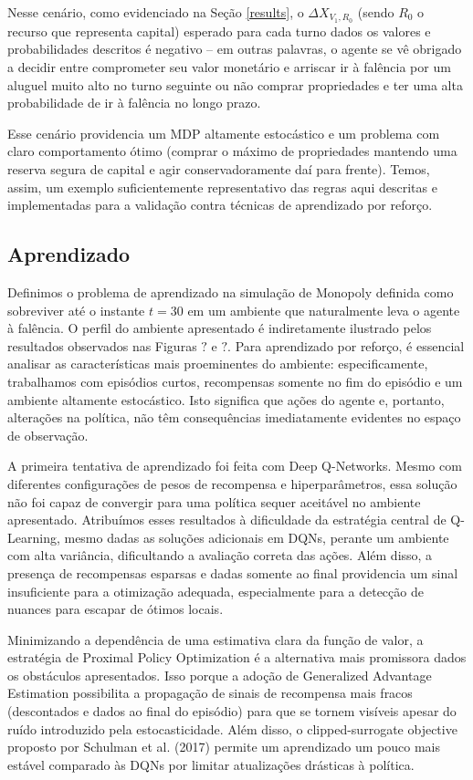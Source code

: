 \documentclass[conference]{IEEEtran}
\begin{document}
Nesse cenário, como evidenciado na Seção \ref{results}, o $\Delta X_{V_1,R_0}$ (sendo $R_0$ o recurso que representa capital) esperado para cada turno dados os valores e probabilidades descritos é negativo -- em outras palavras, o agente se vê obrigado a decidir entre comprometer seu valor monetário e arriscar ir à falência por um aluguel muito alto no turno seguinte ou não comprar propriedades e ter uma alta probabilidade de ir à falência no longo prazo.

Esse cenário providencia um MDP altamente estocástico e um problema com claro comportamento ótimo (comprar o máximo de propriedades mantendo uma reserva segura de capital e agir conservadoramente daí para frente). Temos, assim, um exemplo suficientemente representativo das regras aqui descritas e implementadas para a validação contra técnicas de aprendizado por reforço.

\subsection{Aprendizado}
\label{learning}
Definimos o problema de aprendizado na simulação de Monopoly definida como sobreviver até o instante $t=30$ em um ambiente que naturalmente leva o agente à falência. O perfil do ambiente apresentado é indiretamente ilustrado pelos resultados observados nas Figuras $?$ e $?$. Para aprendizado por reforço, é essencial analisar as características mais proeminentes do ambiente: especificamente, trabalhamos com episódios curtos, recompensas somente no fim do episódio e um ambiente altamente estocástico. Isto significa que ações do agente e, portanto, alterações na política, não têm consequências imediatamente evidentes no espaço de observação.

A primeira tentativa de aprendizado foi feita com Deep Q-Networks. Mesmo com diferentes configurações de pesos de recompensa e hiperparâmetros, essa solução não foi capaz de convergir para uma política sequer aceitável no ambiente apresentado. Atribuímos esses resultados à dificuldade da estratégia central de Q-Learning, mesmo dadas as soluções adicionais em DQNs, perante um ambiente com alta variância, dificultando a avaliação correta das ações. Além disso, a presença de recompensas esparsas e dadas somente ao final providencia um sinal insuficiente para a otimização adequada, especialmente para a detecção de nuances para escapar de ótimos locais.

Minimizando a dependência de uma estimativa clara da função de valor, a estratégia de Proximal Policy Optimization\cite{ppo} é a alternativa mais promissora dados os obstáculos apresentados. Isso porque a adoção de Generalized Advantage Estimation possibilita a propagação de sinais de recompensa mais fracos (descontados e dados ao final do episódio) para que se tornem visíveis apesar do ruído introduzido pela estocasticidade. Além disso, o clipped-surrogate objective proposto por Schulman et al. (2017) permite um aprendizado um pouco mais estável comparado às DQNs por limitar atualizações drásticas à política.
\end{document}
